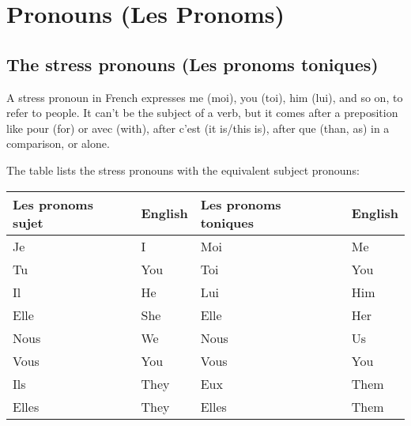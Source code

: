 \section{Pronouns (Les Pronoms)}


\subsection{The stress pronouns (Les pronoms toniques)}

A stress pronoun in French expresses me (moi), you (toi), him (lui),
and so on, to refer to people. It can’t be the subject of a verb,
but it comes after a preposition like pour (for) or avec (with),
after c’est (it is/this is), after que (than, as) in a comparison, or alone.

\noindent The table lists the stress pronouns with the equivalent subject
pronouns:

\vspace{.2in}
\begin{tabular}{l l | l l}
\hline
Les pronoms sujet & English & Les pronoms toniques & English\\
\hline
Je      & I         & Moi       & Me      \\
Tu      & You       & Toi       & You     \\
Il      & He        & Lui       & Him     \\
Elle    & She       & Elle      & Her     \\
Nous    & We        & Nous      & Us      \\
Vous    & You       & Vous      & You     \\
Ils     & They      & Eux       & Them    \\
Elles   & They      & Elles     & Them    \\
\end{tabular}

